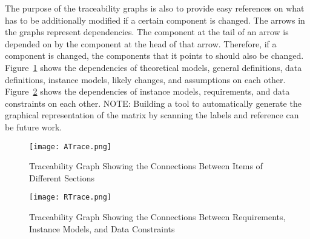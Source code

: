 \documentclass[12pt]{article}
\begin{document}
The purpose of the traceability graphs is also to provide easy references on what has to be additionally modified if a certain component is changed. The arrows in the graphs represent dependencies. The component at the tail of an arrow is depended on by the component at the head of that arrow. Therefore, if a component is changed, the components that it points to should also be changed. Figure~\ref{Figure:TGStCBIoDS} shows the dependencies of theoretical models, general definitions, data definitions, instance models, likely changes, and assumptions on each other. Figure~\ref{Figure:TGStCBRsIMsaDC} shows the dependencies of instance models, requirements, and data constraints on each other.
NOTE: Building a tool to automatically generate the graphical representation of the matrix by scanning the labels and reference can be future work.
\begin{figure}
\begin{center}
\texttt{[image: ATrace.png]}
\caption{Traceability Graph Showing the Connections Between Items of Different Sections}
\label{Figure:TGStCBIoDS}
\end{center}
\end{figure}
\begin{figure}
\begin{center}
\texttt{[image: RTrace.png]}
\caption{Traceability Graph Showing the Connections Between Requirements, Instance Models, and Data Constraints}
\label{Figure:TGStCBRsIMsaDC}
\end{center}
\end{figure}
\end{document}
